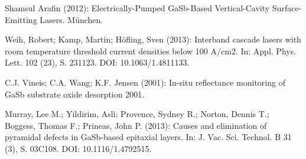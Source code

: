 \documentclass[paper=a4,fontsize=10pt,DIV=18,twocolumn,parskip=half]{scrartcl}
\numberwithin{equation}{section}    %
\begin{document}
\begin{thebibliography}{}   

 Shamsul Arafin (2012): Electrically-Pumped GaSb-Based 
Vertical-Cavity Surface-Emitting Lasers. München.

 Weih, Robert; Kamp, Martin; Höfling, Sven (2013): Interband 
cascade lasers with room temperature threshold current densities below 100 
A/cm2. In: Appl. Phys. Lett. 102 (23), S. 231123. DOI: 10.1063/1.4811133.

 C.J. Vineis; C.A. Wang; K.F. Jensen (2001): In-situ reflectance 
monitoring of GaSb substrate oxide desorption 2001.

 Murray, Lee M.; Yildirim, Asli; Provence, Sydney R.; Norton, 
Dennis T.; Boggess, Thomas F.; Prineas, John P. (2013): Causes and elimination 
of pyramidal defects in GaSb-based epitaxial layers. In: J. Vac. Sci. Technol. B 
31 (3), S. 03C108. DOI: 10.1116/1.4792515.
  

\end{thebibliography}
%
%
\onecolumn
\pagestyle{empty}
\end{document}
